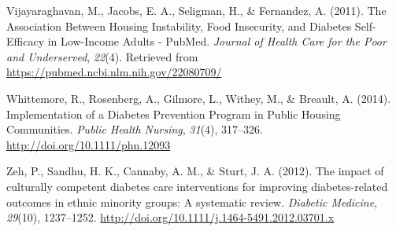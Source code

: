 \documentclass [11pt, proquest] {uwthesis}[2015/03/03]
\begin{document}
\hypertarget{ref-Vijayaraghavan2011}{}
Vijayaraghavan, M., Jacobs, E. A., Seligman, H., \& Fernandez, A.
(2011). The Association Between Housing Instability, Food Insecurity,
and Diabetes Self-Efficacy in Low-Income Adults - PubMed. \emph{Journal
of Health Care for the Poor and Underserved}, \emph{22}(4). Retrieved
from \url{https://pubmed.ncbi.nlm.nih.gov/22080709/}

\hypertarget{ref-Whittemore2014}{}
Whittemore, R., Rosenberg, A., Gilmore, L., Withey, M., \& Breault, A.
(2014). Implementation of a Diabetes Prevention Program in Public
Housing Communities. \emph{Public Health Nursing}, \emph{31}(4),
317--326. \url{http://doi.org/10.1111/phn.12093}

\hypertarget{ref-Zeh2012}{}
Zeh, P., Sandhu, H. K., Cannaby, A. M., \& Sturt, J. A. (2012). The
impact of culturally competent diabetes care interventions for improving
diabetes-related outcomes in ethnic minority groups: A systematic
review. \emph{Diabetic Medicine}, \emph{29}(10), 1237--1252.
\url{http://doi.org/10.1111/j.1464-5491.2012.03701.x}
\end{document}
